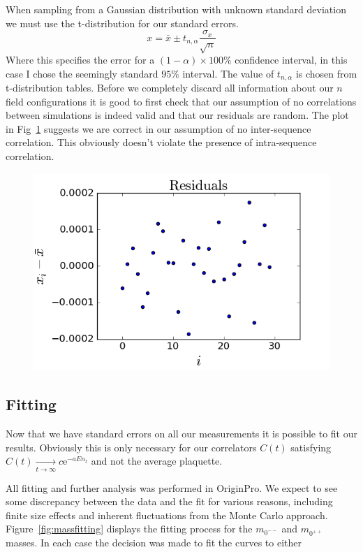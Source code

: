 \documentclass[12pt]{article}
\begin{document}
\par When sampling from a Gaussian distribution with unknown standard deviation we must use the t-distribution for our standard errors.
\begin{equation}
x = \bar{x} \pm t_{n,\alpha} \frac{\sigma_x}{\sqrt{n}}
\end{equation}
Where this specifies the error for a $(1-\alpha)\times100\%$ confidence interval, in this case I chose the seemingly standard $95\%$ interval. The value of $t_{n,\alpha}$ is chosen from t-distribution tables. Before we completely discard all information about our $n$ field configurations it is good to first check that our assumption of no correlations between simulations is indeed valid and that our residuals are random. The plot in Fig~\ref{fig:residuals} suggests we are correct in our assumption of no inter-sequence correlation. This obviously doesn't violate the presence of intra-sequence correlation.

\begin{figure}
\centering
\includegraphics[width=0.6\linewidth]{residuals.png}
\caption{\label{fig:residuals} }
\end{figure}


\subsection{Fitting}
Now that we have standard errors on all our measurements it is possible to fit our results. Obviously this is only necessary for our correlators $C(t)$ satisfying $C(t) \underset{t\rightarrow \infty}\rightarrow c\mathrm{e}^{-aEn_t}$ and not the average plaquette.

\par All fitting and further analysis was performed in OriginPro. We expect to see some discrepancy between the data and the fit for various reasons, including finite size effects and inherent fluctuations from the Monte Carlo approach. Figure~\ref{fig:massfitting} displays the fitting process for the $m_{0^{--}}$ and $m_{0^{++}}$ masses. In each case the decision was made to fit the curves to either
\end{document}
